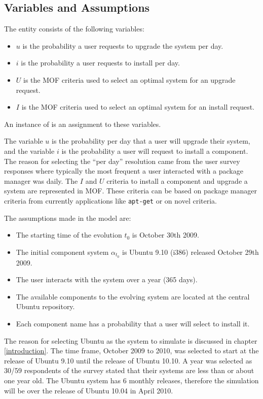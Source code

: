 \subsection{Variables and Assumptions}
The \usermodel entity consists of the following variables: 
\begin{itemize}
  \item $u$ is the probability a user requests to upgrade the system per day.
  \item $i$ is the probability a user requests to install per day.
  \item $U$ is the MOF criteria used to select an optimal system for an upgrade request.
  \item $I$ is the MOF criteria used to select an optimal system for an install request.
\end{itemize}
An instance of \usermodel is an assignment to these variables.

The variable $u$ is the probability per day that a user will upgrade their system, and the variable $i$ is the probability a user will request to install a component.
The reason for selecting the ``per day'' resolution came from the user survey responses where typically the most frequent a user interacted with a package manager was daily.
The $I$ and $U$ criteria to install a component and upgrade a system are represented in MOF.
These criteria can be based on package manager criteria from currently applications like \texttt{apt-get} or on novel criteria.

The assumptions made in the \usermodel model are:
\begin{itemize}
  \item The starting time of the evolution $t_0$ is October 30th 2009.
  \item The initial component system $\alpha_{t_0}$ is Ubuntu 9.10 (i386) released October 29th 2009.
  \item The user interacts with the system over a year (365 days).
  \item The available components to the evolving system are located at the central Ubuntu repository.
  \item Each component name has a probability that a user will select to install it. 
\end{itemize}

The reason for selecting Ubuntu as the system to simulate is discussed in chapter \ref{introduction}.
The time frame, October 2009 to 2010, was selected to start at the release of Ubuntu 9.10 until the release of Ubuntu 10.10.
A year was selected as 30/59 respondents of the survey stated that their systems are less than or about one year old.
The Ubuntu system has 6 monthly releases, therefore the simulation will be over the release of Ubuntu 10.04 in April 2010.

